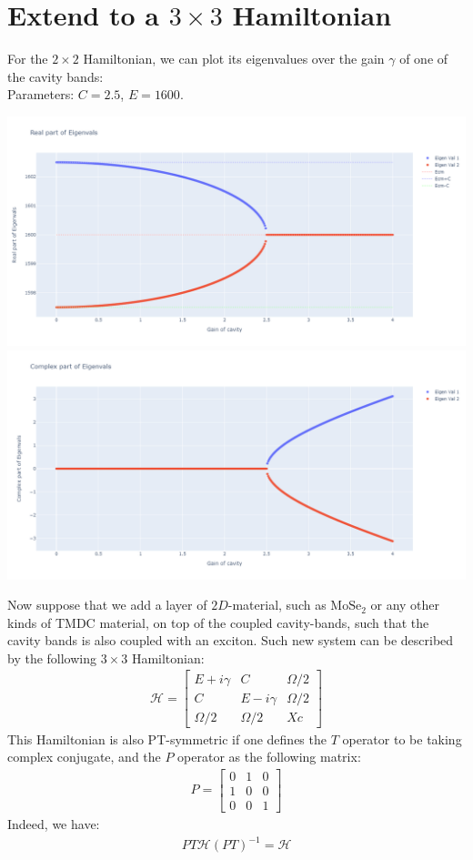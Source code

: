 \documentclass[1pt]{book}
\theoremstyle{break}
\theoremstyle{break}
\newcommand{\bmat}[1]{\begin{bmatrix} #1 \end{bmatrix}}
\begin{document}
\newpage
\section{Extend to a $3\times 3$ Hamiltonian}
For the $2\times 2$ Hamiltonian, we can plot its eigenvalues over the gain $\gamma$ of one of the cavity bands:\\

Parameters: $C = 2.5$, $E = 1600$. 
\begin{center}
\includegraphics[scale=0.25]{2x2HamReal.png}
\includegraphics[scale=0.25]{2x2HamComp.png}
\end{center}

Now suppose that we add a layer of $2D$-material, such as $\text{MoSe}_2$ or any other kinds of TMDC material, on top of the coupled cavity-bands, such that the cavity bands is also coupled with an exciton. Such new system can be described by the following $3\times 3$ Hamiltonian:
\begin{align*}
\mathcal{H} = \bmat{E+i\gamma & C & \Omega/2\\
     				C & E-i\gamma & \Omega/2\\
     				\Omega/2 & \Omega/2 & Xc}
\end{align*}
This Hamiltonian is also PT-symmetric if one defines the $T$ operator to be taking complex conjugate, and the $P$ operator as the following matrix:
\begin{align*}
P = \bmat{0 & 1 & 0 \\
	      1 & 0 & 0 \\
	      0 & 0 & 1}
\end{align*}
Indeed, we have:
\begin{align*}
PT\mathcal{H}(PT)^{-1} = \mathcal{H}
\end{align*}
\end{document}
